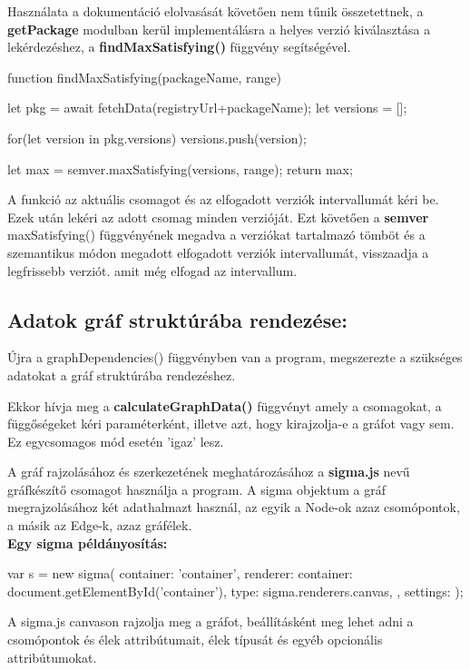 Használata a dokumentáció elolvasását követően nem tűnik összetettnek, a \textbf{getPackage} modulban kerül implementálásra a helyes verzió kiválasztása a lekérdezéshez, a \textbf{findMaxSatisfying()} függvény segítségével.

\pagebreak

\begin{cpp}
function findMaxSatisfying(packageName, range){
	let pkg = await fetchData(registryUrl+packageName);
	let versions = [];
	
	for(let version in pkg.versions){
		versions.push(version);
	}
	
	let max = semver.maxSatisfying(versions, range);
	return max;
}
\end{cpp}

A funkció az aktuális csomagot és az elfogadott verziók intervallumát kéri be. Ezek után lekéri az adott csomag minden verzióját. Ezt követően a \textbf{semver} maxSatisfying() függvényének megadva a verziókat tartalmazó tömböt és a szemantikus módon megadott elfogadott verziók intervallumát, visszaadja a legfrissebb verziót. amit még elfogad az intervallum.\\

\subsection{Adatok gráf struktúrába rendezése:}

Újra a graphDependencies() függvényben van a program, megszerezte a szükséges adatokat a gráf struktúrába rendezéshez.

Ekkor hívja meg a \textbf{calculateGraphData()} függvényt amely a csomagokat, a függőségeket kéri paraméterként, illetve azt, hogy kirajzolja-e a gráfot vagy sem. Ez egycsomagos mód esetén 'igaz' lesz.

A gráf rajzolásához és szerkezetének meghatározásához a \textbf{sigma.js} nevű gráfkészítő csomagot használja a program. A sigma objektum a gráf megrajzolásához két adathalmazt használ, az egyik a Node-ok azaz csomópontok, a másik az Edge-k, azaz gráfélek.\\

\textbf{Egy sigma példányosítás:
}
\begin{cpp}
var s = new sigma({ 
	container: 'container',
	renderer: {
		container: document.getElementById('container'),
		type: sigma.renderers.canvas,
	},
	settings: {
	}
}); 
\end{cpp}

A sigma.js canvason rajzolja meg a gráfot, beállításként meg lehet adni a csomópontok és élek attribútumait, élek típusát és egyéb opcionális attribútumokat.

